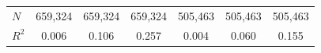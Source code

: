 \documentclass[serif, aspectratio=169]{beamer}
\begin{document}
\begin{frame}
\begin{table}[htbp]
\begin{tabular}{@{}l*{6}{c}@{}}
$\textit{N}$&  659,324         &  659,324         &  659,324         &  505,463         &  505,463         &  505,463         \\
$\textit{R}^2$&    0.006         &    0.106         &    0.257         &    0.004         &    0.060         &    0.155         \\
\bottomrule
\end{tabular}
\\\\
\\

\label{table:DID_OLS}

\end{table}

\end{frame}


\end{document}
